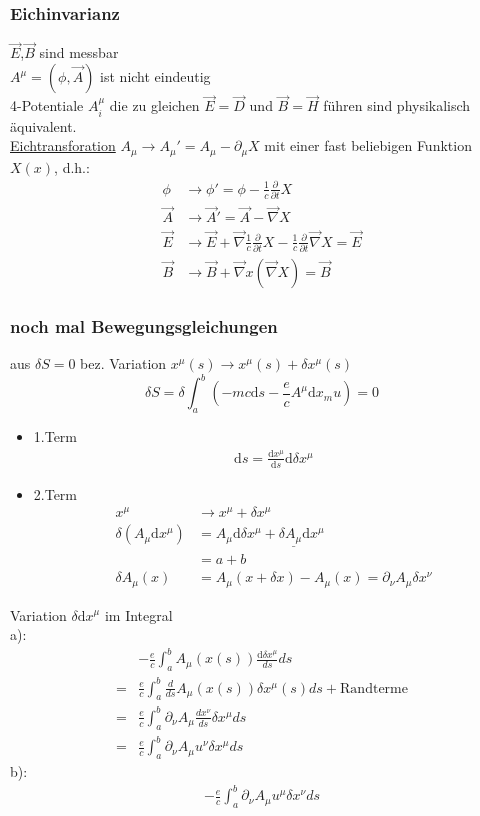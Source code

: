 \documentclass[a4paper]{article}
\begin{document}
\subsubsection{Eichinvarianz}
$\vec{E}$,$\vec{B}$ sind messbar\\
$A^\mu=(\phi,\vec{A})$ ist nicht eindeutig\\
4-Potentiale $A^\mu_i$ die zu gleichen $\vec{E}=\vec{D}$ und $\vec{B}=\vec{H}$
führen sind physikalisch äquivalent.\\
\underline{Eichtransforation} $A_\mu\rightarrow A_\mu'=A_\mu-\partial_\mu X$ mit
einer fast beliebigen Funktion $X(x)$, d.h.:\\
\begin{align}
\phi &\rightarrow \phi'=\phi-\frac{1}{c}\frac{\partial}{\partial t} X\\
\vec{A} &\rightarrow \vec{A}'=\vec{A}-\vec{\nabla}X\\
\vec{E}&\rightarrow\vec{E}+\vec{\nabla}\frac{1}{c}\frac{\partial}{\partial t}
X-\frac{1}{c}\frac{\partial}{\partial t} \vec{\nabla}X=\vec{E}\\
\vec{B}&\rightarrow\vec{B}+\vec{\nabla}x(\vec{\nabla}X)=\vec{B}
\end{align}
\subsubsection{noch mal Bewegungsgleichungen}
aus $\delta S=0$ bez. Variation $x^\mu(s)\rightarrow x^\mu(s)+\delta x^\mu(s)$
\begin{equation}
\delta S=\delta \int^b_a(-mc\mathrm{d}s-\frac{e}{c}A^\mu \mathrm{d} x_mu)=0
\end{equation}
\begin{itemize}
  \item{1.Term} \begin{align}\mathrm{d}s=\frac{\mathrm{d} x^\mu}{\mathrm{d}
  s}\mathrm{d} \delta x^\mu
  \end{align}
  \item{2.Term} \begin{align}x^\mu&\rightarrow x^\mu+\delta x^\mu\\
  \delta(A_\mu \mathrm{d}\!x^\mu)&=A_\mu \mathrm{d}\delta\!x^\mu+\delta
  \underline{A_\mu} \mathrm{d}x^\mu\\&=a+b\\
  \delta A_\mu(x)&=A_\mu(x+\delta x)-A_\mu(x)=\partial_\nu A_\mu \delta x^\nu
  \end{align}
\end{itemize}
Variation $\delta \mathrm{d}x^\mu$ im Integral\\ 
a):
\begin{align}
&-\frac{e}{c}\int^b_a A_\mu(x(s))\frac{\mathrm{d}\delta x^\mu}{ds}ds\\
=&\frac{e}{c}\int^b_a \frac{d}{ds}A_\mu(x(s))\delta x^\mu(s) ds +
\text{Randterme}\\
=&\frac{e}{c}\int^b_a \partial_\nu A_\mu \frac{dx^\nu}{ds}\delta x^\mu ds\\
=&\frac{e}{c}\int^b_a \partial_\nu A_\mu u^\nu\delta x^\mu ds
\end{align}
b):
\begin{align}
-\frac{e}{c}\int^b_a \partial_\nu A_\mu u^\mu\delta x^\nu ds
\end{align}
\end{document}
